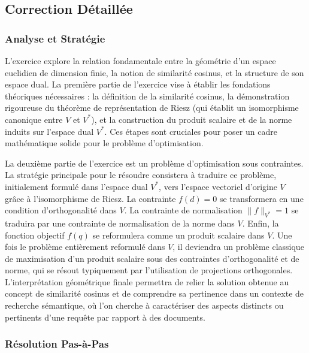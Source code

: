 \documentclass[11pt,a4paper]{report}
\begin{document}
\hypertarget{correction-duxe9tailluxe9e}{%
\subsection{Correction Détaillée}\label{correction-duxe9tailluxe9e}}

\hypertarget{analyse-et-stratuxe9gie}{%
\subsubsection{Analyse et Stratégie}\label{analyse-et-stratuxe9gie}}

L'exercice explore la relation fondamentale entre la géométrie d'un
espace euclidien de dimension finie, la notion de similarité cosinus, et
la structure de son espace dual. La première partie de l'exercice vise à
établir les fondations théoriques nécessaires : la définition de la
similarité cosinus, la démonstration rigoureuse du théorème de
représentation de Riesz (qui établit un isomorphisme canonique entre
\(V\) et \(V^*\)), et la construction du produit scalaire et de la norme
induits sur l'espace dual \(V^*\). Ces étapes sont cruciales pour poser
un cadre mathématique solide pour le problème d'optimisation.

La deuxième partie de l'exercice est un problème d'optimisation sous
contraintes. La stratégie principale pour le résoudre consistera à
traduire ce problème, initialement formulé dans l'espace dual \(V^*\),
vers l'espace vectoriel d'origine \(V\) grâce à l'isomorphisme de Riesz.
La contrainte \(f(d)=0\) se transformera en une condition
d'orthogonalité dans \(V\). La contrainte de normalisation
\(\|f\|_{V^*}=1\) se traduira par une contrainte de normalisation de la
norme dans \(V\). Enfin, la fonction objectif \(f(q)\) se reformulera
comme un produit scalaire dans \(V\). Une fois le problème entièrement
reformulé dans \(V\), il deviendra un problème classique de maximisation
d'un produit scalaire sous des contraintes d'orthogonalité et de norme,
qui se résout typiquement par l'utilisation de projections orthogonales.
L'interprétation géométrique finale permettra de relier la solution
obtenue au concept de similarité cosinus et de comprendre sa pertinence
dans un contexte de recherche sémantique, où l'on cherche à caractériser
des aspects distincts ou pertinents d'une requête par rapport à des
documents.

\hypertarget{ruxe9solution-pas-uxe0-pas}{%
\subsubsection{Résolution Pas-à-Pas}\label{ruxe9solution-pas-uxe0-pas}}
\end{document}
